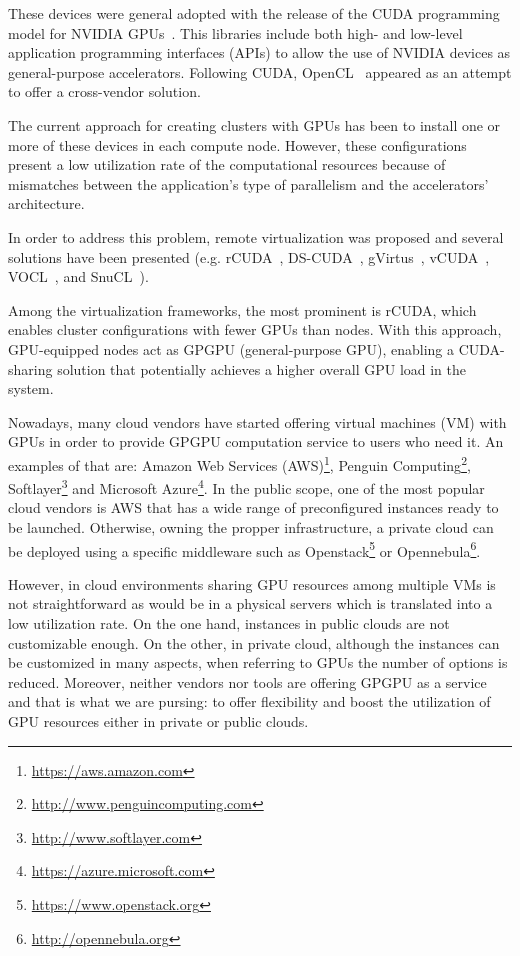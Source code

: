 \documentclass[a4paper,twoside]{article}
\begin{document}
These devices were general adopted with the release of the CUDA programming model for
NVIDIA GPUs~\cite{cuda65}. This libraries include both high- and low-level application programming interfaces (APIs)
to allow the use of NVIDIA devices as general-purpose
accelerators.
Following CUDA, OpenCL~\cite{opencl} appeared as an attempt
to offer a cross-vendor solution.

The current approach for creating clusters with GPUs has been to
install one or more of these devices in each compute node.
However, these configurations present a low
utilization rate of the computational resources
 because of mismatches between the application's type of parallelism
and the accelerators' architecture.

In order to address this problem, remote virtualization was proposed
and several solutions have been presented (e.g. {rCUDA}~\cite{tonithesis,toniparco},
DS-CUDA~\cite{dscuda}, gVirtus~\cite{gvirtus}, vCUDA~\cite{vcuda}, VOCL~\cite{vocl}, and SnuCL~\cite{snucl}).

Among the virtualization frameworks, the most
prominent is {rCUDA}, which
enables cluster configurations with fewer GPUs than nodes.  With this
approach, GPU-equipped nodes act as GPGPU (general-purpose GPU), enabling a CUDA-sharing solution that potentially achieves
a higher overall GPU load in the system.

Nowadays, many cloud vendors have started offering virtual machines (VM) with GPUs in order to provide
GPGPU computation service to users who need it. An examples of that are:
Amazon Web Services (AWS)\footnote{\url{https://aws.amazon.com}}, 
Penguin Computing\footnote{\url{http://www.penguincomputing.com}}, 
Softlayer\footnote{\url{http://www.softlayer.com}} and 
Microsoft Azure\footnote{\url{https://azure.microsoft.com}}.
In the public scope, one of the most popular cloud vendors is AWS that has a wide range of preconfigured instances ready to be launched.
Otherwise, owning the propper infrastructure, a private cloud can be deployed using a specific middleware such as
Openstack\footnote{\url{https://www.openstack.org}} or Opennebula\footnote{\url{http://opennebula.org}}.

However, in cloud environments sharing GPU resources among multiple VMs
is not straightforward as would be in a physical servers which is translated into a low utilization rate.
On the one hand, instances in public clouds are not customizable enough. 
On the other, in private cloud, although the instances can be customized in many aspects, when referring to GPUs
the number of options is reduced.
Moreover, neither vendors nor tools are offering GPGPU as a service and that is what we are pursing:
to offer flexibility and boost the utilization of GPU resources either in private or public clouds.
\end{document}
